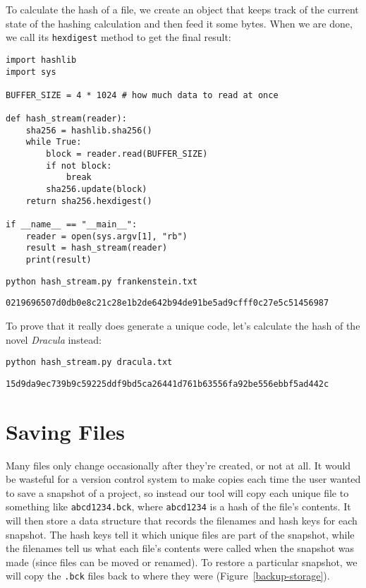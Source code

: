 \documentclass{scrbook}
\newcommand{\figref}[1]{Figure~\ref{#1}}
\begin{document}
To calculate the hash of a file,
we create an object that keeps track of the current state of the hashing calculation
and then feed it some bytes.
When we are done,
we call its \texttt{hexdigest} method to  get the final result:


\begin{lstlisting}[frame=single,frameround=tttt]
import hashlib
import sys

BUFFER_SIZE = 4 * 1024 # how much data to read at once

def hash_stream(reader):
    sha256 = hashlib.sha256()
    while True:
        block = reader.read(BUFFER_SIZE)
        if not block:
            break
        sha256.update(block)
    return sha256.hexdigest()

if __name__ == "__main__":
    reader = open(sys.argv[1], "rb")
    result = hash_stream(reader)
    print(result)
\end{lstlisting}



\begin{lstlisting}[frame=single,frameround=tttt]
python hash_stream.py frankenstein.txt
\end{lstlisting}



\begin{lstlisting}[frame=single,frameround=tttt]
0219696507d0db0e8c21c28e1b2de642b94de91be5ad9cfff0c27e5c51456987
\end{lstlisting}



To prove that it really does generate a unique code,
let's calculate the hash of the novel \emph{Dracula} instead:


\begin{lstlisting}[frame=single,frameround=tttt]
python hash_stream.py dracula.txt
\end{lstlisting}



\begin{lstlisting}[frame=single,frameround=tttt]
15d9da9ec739b9c59225ddf9bd5ca26441d761b63556fa92be556ebbf5ad442c
\end{lstlisting}



\section{Saving Files}\label{backup-files}


Many files only change occasionally after they're created, or not at all.
It would be wasteful for a version control system to make copies
each time the user wanted to save a snapshot of a project,
so instead our tool will copy each unique file to something like \texttt{abcd1234.bck},
where \texttt{abcd1234} is a hash of the file's contents.
It will then store a data structure that records the filenames and hash keys for each snapshot.
The hash keys tell it which unique files are part of the snapshot,
while the filenames tell us what each file's contents were called when the snapshot was made
(since files can be moved or renamed).
To restore a particular snapshot,
we will copy the \texttt{.bck} files back to where they were
(\figref{backup-storage}).
\end{document}
